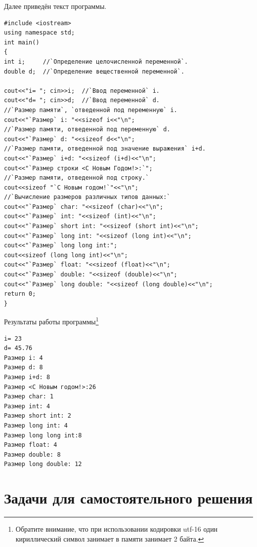 Далее приведён текст программы.
\begin{lstlisting}
#include <iostream>
using namespace std;
int main()
{
int i;     //`Определение целочисленной переменной`.
double d;  //`Определение вещественной переменной`.

cout<<"i= "; cin>>i;  //`Ввод переменной` i.
cout<<"d= "; cin>>d;  //`Ввод переменной` d.
//`Размер памяти`, `отведенной под переменную` i.
cout<<"`Размер` i: "<<sizeof i<<"\n";
//`Размер памяти, отведенной под переменную` d.
cout<<"`Размер` d: "<<sizeof d<<"\n";
//`Размер памяти, отведенной под значение выражения` i+d.
cout<<"`Размер` i+d: "<<sizeof (i+d)<<"\n";
cout<<"`Размер строки <С Новым Годом!>:`";
//`Размер памяти, отведенной под строку.`
cout<<sizeof "`С Новым годом!`"<<"\n";
//`Вычисление размеров различных типов данных:`
cout<<"`Размер` char: "<<sizeof (char)<<"\n";
cout<<"`Размер` int: "<<sizeof (int)<<"\n";
cout<<"`Размер` short int: "<<sizeof (short int)<<"\n";
cout<<"`Размер` long int: "<<sizeof (long int)<<"\n";
cout<<"`Размер` long long int:";
cout<<sizeof (long long int)<<"\n";
cout<<"`Размер` float: "<<sizeof (float)<<"\n";
cout<<"`Размер` double: "<<sizeof (double)<<"\n";
cout<<"`Размер` long double: "<<sizeof (long double)<<"\n";
return 0;
}
\end{lstlisting}

Результаты работы программы\footnote{Обратите внимание, что при использовании кодировки utf-16 один кириллический символ
занимает в памяти занимает 2 байта.}

\begin{verbatim}
i= 23 
d= 45.76 
Размер i: 4 
Размер d: 8 
Размер i+d: 8 
Размер <С Новым годом!>:26 
Размер char: 1 
Размер int: 4 
Размер short int: 2 
Размер long int: 4 
Размер long long int:8 
Размер float: 4 
Размер double: 8 
Размер long double: 12 
\end{verbatim}

\section[Задачи для самостоятельного решения]{Задачи для самостоятельного решения}
